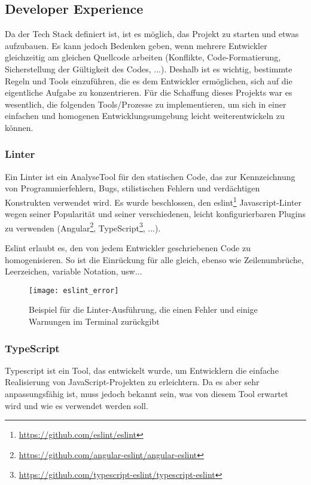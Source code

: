 \subsection{Developer Experience}
Da der Tech Stack definiert ist, ist es möglich, das Projekt zu starten und etwas aufzubauen.
Es kann jedoch Bedenken geben, wenn mehrere Entwickler gleichzeitig am gleichen Quellcode arbeiten (Konflikte, Code-Formatierung, Sicherstellung der Gültigkeit des Codes, ...).
Deshalb ist es wichtig, bestimmte Regeln und Tools einzuführen, die es dem Entwickler ermöglichen, sich auf die eigentliche Aufgabe zu konzentrieren.
Für die Schaffung dieses Projekts war es wesentlich, die folgenden Tools/Prozesse zu implementieren, um sich in einer einfachen und homogenen Entwicklungsumgebung leicht weiterentwickeln zu können.

\subsubsection{Linter}
Ein Linter ist ein AnalyseTool für den statischen Code, das zur Kennzeichnung von Programmierfehlern, Bugs, stilistischen Fehlern und verdächtigen Konstrukten verwendet wird.
Es wurde beschlossen, den eslint\footnote{\href{https://github.com/eslint/eslint}{https://github.com/eslint/eslint}} Javascript-Linter wegen seiner Popularität und seiner verschiedenen, leicht konfigurierbaren Plugins zu verwenden (Angular\footnote{\href{https://github.com/angular-eslint/angular-eslint}{https://github.com/angular-eslint/angular-eslint}}, TypeScript\footnote{\href{https://github.com/typescript-eslint/typescript-eslint}{https://github.com/typescript-eslint/typescript-eslint}}, ...).

Eslint erlaubt es, den von jedem Entwickler geschriebenen Code zu homogenisieren.
So ist die Einrückung für alle gleich, ebenso wie Zeilenumbrüche, Leerzeichen, variable Notation, usw...

\begin{figure}[h]
  \centering
  \texttt{[image: eslint\_error]}
  \caption{Beispiel für die Linter-Ausführung, die einen Fehler und einige Warnungen im Terminal zurückgibt}
\end{figure}

\subsubsection{TypeScript}

Typescript ist ein Tool, das entwickelt wurde, um Entwicklern die einfache Realisierung von JavaScript-Projekten zu erleichtern.
Da es aber sehr anpassungsfähig ist, muss jedoch bekannt sein, was von diesem Tool erwartet wird und wie es verwendet werden soll.

